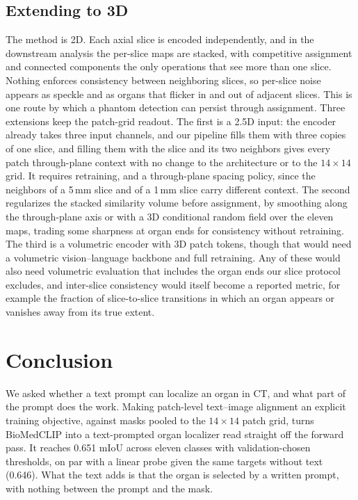 \documentclass[10pt]{article}
\begin{document}
\subsection{Extending to 3D}
\label{sec:discussion:3d}

The method is 2D. Each axial slice is encoded independently, and in the
downstream analysis the per-slice maps are stacked, with competitive assignment
and connected components the only operations that see more than one slice.
Nothing enforces consistency between neighboring slices, so per-slice noise
appears as speckle and as organs that flicker in and out of adjacent slices. This is one route by which a phantom detection can persist through
assignment. Three extensions keep the patch-grid readout. The first is a 2.5D
input: the encoder already takes three input channels, and our pipeline fills them with three copies of one slice, and filling them with the slice and its two
neighbors gives every patch through-plane context with no change to the
architecture or to the $14\times14$ grid. It requires retraining, and a
through-plane spacing policy, since the neighbors of a 5\,mm slice and of a
1\,mm slice carry different context. The second regularizes the stacked
similarity volume before assignment, by smoothing along the through-plane axis
or with a 3D conditional random field over the eleven maps, trading some
sharpness at organ ends for consistency without retraining. The third is a
volumetric encoder with 3D patch tokens, though that would need a volumetric
vision--language backbone and full retraining. Any of these would also need
volumetric evaluation that includes the organ ends our slice protocol excludes,
and inter-slice consistency would itself become a reported metric, for example
the fraction of slice-to-slice transitions in which an organ appears or vanishes
away from its true extent.

\section{Conclusion}
\label{sec:conclusion}

We asked whether a text prompt can localize an organ in CT, and what part of the
prompt does the work. Making patch-level text--image alignment an explicit
training objective, against masks pooled to the $14\times14$ patch grid, turns
BioMedCLIP into a text-prompted organ localizer read straight off the forward
pass. It reaches 0.651 mIoU across eleven classes with validation-chosen
thresholds, on par with a linear probe given the same targets without text
(0.646). What the text adds is that the organ is selected by a written prompt,
with nothing between the prompt and the mask.
\end{document}
